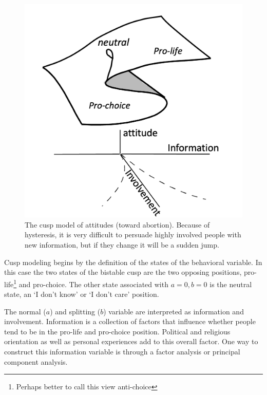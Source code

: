 \documentclass[
  a4paper,
  DIV=11,
  numbers=noendperiod,
  oneside]{scrreprt}
\begin{document}
\begin{figure}

{\centering \includegraphics{media/ch3/image13.jpg}

}

\caption{\label{fig-ch3-img13-old-25}The cusp model of attitudes (toward
abortion). Because of hysteresis, it is very difficult to persuade
highly involved people with new information, but if they change it will
be a sudden jump.}

\end{figure}

Cusp modeling begins by the definition of the states of the behavioral
variable. In this case the two states of the bistable cusp are the two
opposing positions, pro-life\footnote{Perhaps better to call this view
  anti-choice} and pro-choice. The other state associated with
\(a = 0, b = 0\) is the neutral state, an `I don't know' or `I don't
care' position.

The normal (\(a\)) and splitting (\(b\)) variable are interpreted as
information and involvement. Information is a collection of factors that
influence whether people tend to be in the pro-life and pro-choice
position. Political and religious orientation as well as personal
experiences add to this overall factor. One way to construct this
information variable is through a factor analysis or principal component
analysis.
\end{document}
